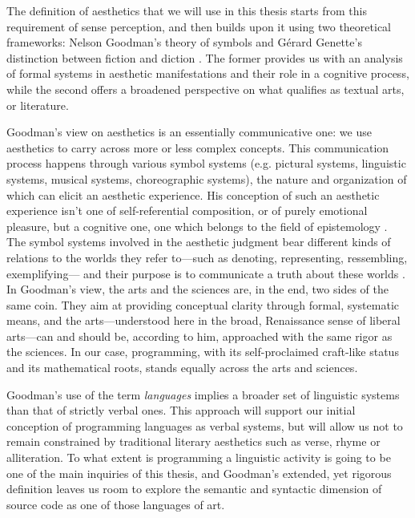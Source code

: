 The definition of aesthetics that we will use in this thesis starts from this requirement of sense perception, and then builds upon it using two theoretical frameworks: Nelson Goodman's theory of symbols \citep{goodman_languages_1976} and Gérard Genette's distinction between fiction and diction \citep{genette_fiction_1993}. The former provides us with an analysis of formal systems in aesthetic manifestations and their role in a cognitive process, while the second offers a broadened perspective on what qualifies as textual arts, or literature.

Goodman's view on aesthetics is an essentially communicative one: we use aesthetics to carry across more or less complex concepts. This communication process happens through various symbol systems (e.g. pictural systems, linguistic systems, musical systems, choreographic systems), the nature and organization of which can elicit an aesthetic experience. His conception of such an aesthetic experience isn't one of self-referential composition, or of purely emotional pleasure, but a cognitive one, one which belongs to the field of epistemology \citep{goodman_languages_1976}. The symbol systems involved in the aesthetic judgment bear different kinds of relations to the worlds they refer to—such as denoting, representing, ressembling, exemplifying— and their purpose is to communicate a truth about these worlds \citep{goodman_ways_1978}. In Goodman's view, the arts and the sciences are, in the end, two sides of the same coin. They aim at providing conceptual clarity through formal, systematic means, and the arts—understood here in the broad, Renaissance sense of liberal arts—can and should be, according to him, approached with the same rigor as the sciences. In our case, programming, with its self-proclaimed craft-like status and its mathematical roots, stands equally across the arts and sciences.

Goodman's use of the term \emph{languages} implies a broader set of linguistic systems than that of strictly verbal ones. This approach will support our initial conception of programming languages as verbal systems, but will allow us not to remain constrained by traditional literary aesthetics such as verse, rhyme or alliteration. To what extent is programming a linguistic activity is going to be one of the main inquiries of this thesis, and Goodman's extended, yet rigorous definition leaves us room to explore the semantic and syntactic dimension of source code as one of those languages of art.


